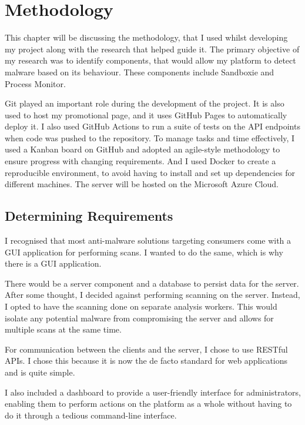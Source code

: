 \chapter{Methodology}

This chapter will be discussing the methodology,
that I used whilst developing my project
along with the research that helped guide it.
The primary objective of my research was to identify components,
that would allow my platform to detect malware based on its behaviour.
These components include Sandboxie and Process Monitor.

Git played an important role during the development of the project.
It is also used to host my promotional page,
and it uses GitHub Pages to automatically deploy it.
I also used GitHub Actions to run a suite of tests on the
API endpoints when code was pushed to the repository.
To manage tasks and time effectively, I used a Kanban board on GitHub
and adopted an agile-style methodology to ensure
progress with changing requirements.
And I used Docker to create a reproducible environment,
to avoid having to install and set up dependencies for different machines.
The server will be hosted on the Microsoft Azure Cloud.

\section{Determining Requirements}
I recognised that most anti-malware solutions targeting consumers
come with a GUI application for performing scans.
I wanted to do the same, which is why there is a GUI application.

There would be a server component and a database to persist data for the server.
After some thought, I decided against performing scanning on the server.
Instead, I opted to have the scanning done on separate analysis workers.
This would isolate any potential malware from compromising the server and
allows for multiple scans at the same time.

For communication between the clients and the server, I chose to use RESTful APIs.
I chose this because it is now the de facto standard for web applications and is quite simple.

I also included a dashboard to provide a user-friendly interface for administrators,
enabling them to perform actions on the platform as a whole without
having to do it through a tedious command-line interface.

